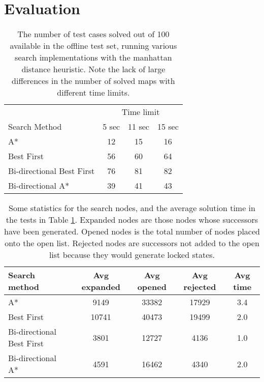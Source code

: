 \documentclass{beamer}
\begin{document}
\section{Evaluation}
\begin{frame}
\begin{table}
  \centering
  \begin{tabular}{lccc}
    & \multicolumn{3}{c}{Time limit}\\
    \cline{2-4}
    Search Method              &  5 sec  &  11 sec  &  15 sec  \\
    \hline
    A*                         &     12  &      15  &      16  \\
    Best First                 &     56  &      60  &      64  \\
    Bi-directional Best First  &     76  &      81  &      82  \\
    Bi-directional A*          &     39  &      41  &      43  \\
  \end{tabular}

  \caption{The number of test cases solved out of 100 available in the offline
    test set, running various search implementations with the manhattan distance
    heuristic. Note the lack of large differences in the number of solved maps
    with different time limits.}
  \label{fig:passedtests}
\end{table}
\end{frame}


\begin{frame}
\begin{table}[b]
  \centering
    \begin{tabular}{lcccc}
      Search method              &  Avg expanded  &  Avg opened  &  Avg rejected  &  Avg time  \\
      \hline
      A*                         &          9149  &       33382  &         17929  &           3.4  \\
      Best First                 &         10741  &       40473  &         19499  &           2.0  \\
      Bi-directional Best First  &          3801  &       12727  &          4136  &           1.0  \\
      Bi-directional A*          &          4591  &       16462  &          4340  &           2.0  \\
    \end{tabular}
  \caption{Some statistics for the search nodes, and the average solution time
    in the tests in Table \ref{fig:passedtests}. Expanded nodes are those nodes
    whose successors have been generated. Opened nodes is the total number of
    nodes placed onto the open list. Rejected nodes are successors not added to
    the open list because they would generate locked states.}
  \label{fig:timings}
\end{table}
\end{frame}
\end{document}
